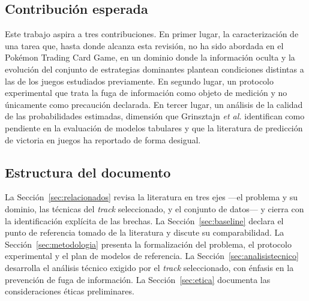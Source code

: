 
\subsection{Contribución esperada}
\label{subsec:contribucion}

Este trabajo aspira a tres contribuciones. En primer lugar, la
caracterización de una tarea que, hasta donde alcanza esta revisión, no ha
sido abordada en el Pok\'emon Trading Card Game, en un dominio donde la
información oculta y la evolución del conjunto de estrategias dominantes
plantean condiciones distintas a las de los juegos estudiados previamente.
En segundo lugar, un protocolo experimental que trata la fuga de
información como objeto de medición y no únicamente como precaución
declarada. En tercer lugar, un análisis de la calidad de las probabilidades
estimadas, dimensión que Grinsztajn \textit{et al.} identifican como
pendiente en la evaluación de modelos tabulares
\cite{grinsztajn_trees_2022} y que la literatura de predicción de victoria
en juegos ha reportado de forma desigual.


\subsection{Estructura del documento}
\label{subsec:estructura}

La Sección~\ref{sec:relacionados} revisa la literatura en tres ejes
---el problema y su dominio, las técnicas del \textit{track} seleccionado,
y el conjunto de datos--- y cierra con la identificación explícita de las
brechas. La Sección~\ref{sec:baseline} declara el punto de referencia
tomado de la literatura y discute su comparabilidad. La
Sección~\ref{sec:metodologia} presenta la formalización del problema, el
protocolo experimental y el plan de modelos de referencia. La
Sección~\ref{sec:analisistecnico} desarrolla el análisis técnico exigido
por el \textit{track} seleccionado, con énfasis en la prevención de fuga de
información. La Sección~\ref{sec:etica} documenta las consideraciones
éticas preliminares.